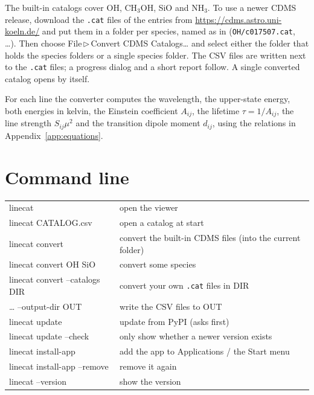\documentclass[11pt]{article}
\newcommand{\menu}[1]{\textsf{#1}}
\newcommand{\then}{\,$\triangleright$\,}
\begin{document}
The built-in catalogs cover OH, CH$_3$OH, SiO and NH$_3$. To use a newer CDMS release, download
the \texttt{.cat} files of the entries from \url{https://cdms.astro.uni-koeln.de/} and put them in a
folder per species, named as in \AppName{} (\texttt{OH/c017507.cat}, \dots). Then choose
\menu{File\then Convert CDMS Catalogs\dots} and select either the folder that holds the species
folders or a single species folder. The CSV files are written next to the \texttt{.cat} files; a
progress dialog and a short report follow. A single converted catalog opens by itself.

For each line the converter computes the wavelength, the upper-state energy, both energies in
kelvin, the Einstein coefficient $A_{ij}$, the lifetime $\tau = 1/A_{ij}$, the line strength
$S_{ij}\mu^2$ and the transition dipole moment $d_{ij}$, using the relations in
Appendix~\ref{app:equations}.

\section{Command line}

\begin{tabular}{@{}>{\ttfamily}l l@{}}
  \toprule
  linecat & open the viewer\\
  linecat CATALOG.csv & open a catalog at start\\
  linecat convert & convert the built-in CDMS files (into the current folder)\\
  linecat convert OH SiO & convert some species\\
  linecat convert --catalogs DIR & convert your own \texttt{.cat} files in DIR\\
  \dots{} --output-dir OUT & write the CSV files to OUT\\
  linecat update & update from PyPI (asks first)\\
  linecat update --check & only show whether a newer version exists\\
  linecat install-app & add the app to Applications / the Start menu\\
  linecat install-app --remove & remove it again\\
  linecat --version & show the version\\
  \bottomrule
\end{tabular}

\end{document}
